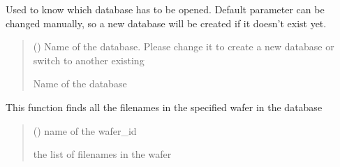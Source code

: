 \documentclass[letterpaper,10pt,english]{sphinxmanual}
\begin{document}

\begin{fulllineitems}
\label{\detokenize{getter:getter.get_db_name}}
\pysigstartsignatures
{}
\pysigstopsignatures
\sphinxAtStartPar
Used to know which database has to be opened. Default parameter can be changed manually, so a new database will be created if it doesn’t exist yet.
\begin{quote}\begin{description}
\sphinxAtStartPar
{} () \textendash{} Name of the database. Please change it to create a new database or switch to another existing

\sphinxAtStartPar
Name of the database

\end{description}\end{quote}

\end{fulllineitems}


\begin{fulllineitems}
\label{\detokenize{getter:getter.get_filenames}}
\pysigstartsignatures
{}
\pysigstopsignatures
\sphinxAtStartPar
This function finds all the filenames in the specified wafer in the database
\begin{quote}\begin{description}
\sphinxAtStartPar
{} () \textendash{} name of the wafer\_id

\sphinxAtStartPar
the list of filenames in the wafer

\end{description}\end{quote}

\end{fulllineitems}
\end{document}
